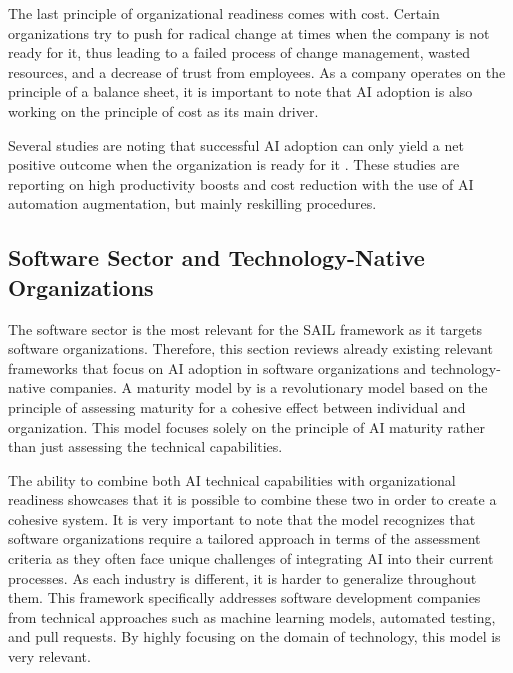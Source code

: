 \documentclass[]{imc-inf}
\begin{document}
The last principle of organizational readiness comes with cost. Certain organizations try to push for radical change at times when the company is not ready for it, thus leading to a failed process of change management, wasted resources, and a decrease of trust from employees. As a company operates on the principle of a balance sheet, it is important to note that AI adoption is also working on the principle of cost as its main driver.

Several studies are noting that successful AI adoption can only yield a net positive outcome when the organization is ready for it \citep{Agrawal2022, Coombs2020, Berente2021, Makarius2020}. These studies are reporting on high productivity boosts and cost reduction with the use of AI automation augmentation, but mainly reskilling procedures.

\subsection{Software Sector and Technology-Native Organizations}

The software sector is the most relevant for the SAIL framework as it targets software organizations. Therefore, this section reviews already existing relevant frameworks that focus on AI adoption in software organizations and technology-native companies. A maturity model by \citep{Garousi2025} is a revolutionary model based on the principle of assessing maturity for a cohesive effect between individual and organization. This model focuses solely on the principle of AI maturity rather than just assessing the technical capabilities. 

The ability to combine both AI technical capabilities with organizational readiness showcases that it is possible to combine these two in order to create a cohesive system. It is very important to note that the model recognizes that software organizations require a tailored approach in terms of the assessment criteria as they often face unique challenges of integrating AI into their current processes. As each industry is different, it is harder to generalize throughout them. This framework specifically addresses software development companies from technical approaches such as machine learning models, automated testing, and pull requests. By highly focusing on the domain of technology, this model is very relevant.
\end{document}
